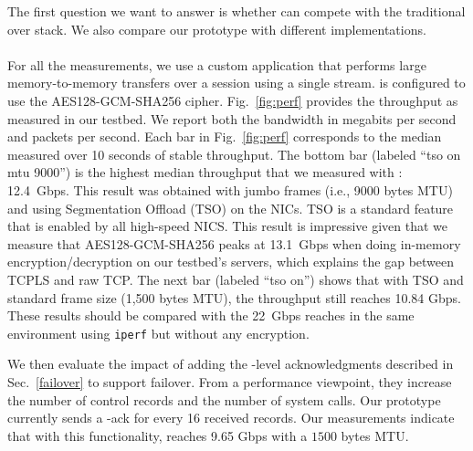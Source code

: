 The first question we want to answer is whether \tcpls can compete with the
traditional \tls over \tcp stack. We also compare our \tcpls prototype with
different \quic implementations.

\paragraph*{\tcpls}
For all the \tcpls measurements, we use a custom application that performs
large memory-to-memory transfers over a \tcpls session using a single stream.
\tcpls is configured to use the AES128-GCM-SHA256 cipher. Fig.~\ref{fig:perf}
provides the throughput as measured in our testbed. We report both the bandwidth in
megabits per second and packets per second. Each bar in Fig.~\ref{fig:perf}
corresponds to the median measured over 10 seconds of stable throughput. The
bottom bar (labeled ``\tcpls tso on mtu 9000'') is the highest median throughput
that we measured with \tcpls: 12.4~Gbps. This result was obtained with jumbo
frames (i.e., 9000 bytes MTU) and using \tcp Segmentation Offload (TSO) on the
NICs. TSO is a standard feature that is enabled by all high-speed NICS. This
result is impressive given that we measure that AES128-GCM-SHA256 peaks at
13.1~Gbps when doing in-memory encryption/decryption on our testbed's servers,
which explains the gap between TCPLS and raw TCP.
The next bar (labeled ``\tcpls tso on'') shows that with TSO and standard frame
size (1,500 bytes MTU), the throughput still reaches 10.84 Gbps. These
results should be compared with the 22~Gbps \tcp reaches in the same
environment using \texttt{iperf} but without any encryption.




We then evaluate the impact of adding the \tcpls-level acknowledgments
described in Sec.~\ref{failover} to support failover.
From a performance viewpoint, they increase the number of control records and
the number of system calls. Our prototype currently sends a \tcpls-ack for every
16 received records. Our measurements indicate that with this functionality,
\tcpls reaches 9.65 Gbps with a $1500$ bytes MTU.

